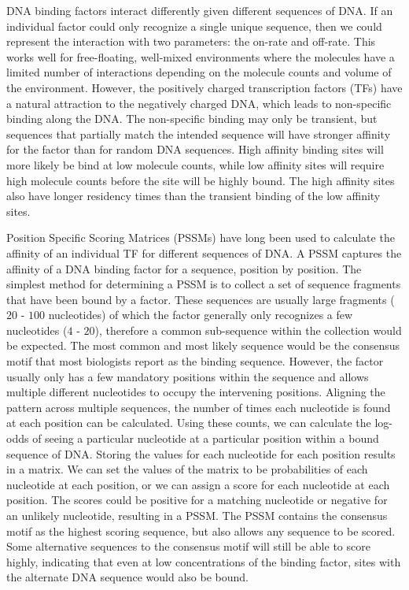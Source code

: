 \documentclass{article}
\newcommand{\tab}{\hspace{9mm}}
\begin{document}
\tab DNA binding factors interact differently given different sequences of DNA. If an individual factor could only recognize a single unique sequence, then we could represent the interaction with two parameters: the on-rate and off-rate. This works well for free-floating, well-mixed environments where the molecules have a limited number of interactions depending on the molecule counts and volume of the environment. However, the positively charged transcription factors (TFs) have a natural attraction to the negatively charged DNA, which leads to non-specific binding along the DNA. The non-specific binding may only be transient, but sequences that partially match the intended sequence will have stronger affinity for the factor than for random DNA sequences. High affinity binding sites will more likely be bind at low molecule counts, while low affinity sites will require high molecule counts before the site will be highly bound. The high affinity sites also have longer residency times than the transient binding of the low affinity sites.

\tab Position Specific Scoring Matrices (PSSMs) have long been used to calculate the affinity of an individual TF for different sequences of DNA. A PSSM captures the affinity of a DNA binding factor for a sequence, position by position. The simplest method for determining a PSSM is to collect a set of sequence fragments that have been bound by a factor. These sequences are usually large fragments ($20$ - $100$ nucleotides) of which the factor generally only recognizes a few nucleotides ($4$ - $20$), therefore a common sub-sequence within the collection would be expected. The most common and most likely sequence would be the consensus motif that most biologists report as the binding sequence. However, the factor usually only has a few mandatory positions within the sequence and allows multiple different nucleotides to occupy the intervening positions. Aligning the pattern across multiple sequences, the number of times each nucleotide is found at each position can be calculated. Using these counts, we can calculate the log-odds of seeing a particular nucleotide at a particular position within a bound sequence of DNA. Storing the values for each nucleotide for each position results in a matrix. We can set the values of the matrix to be probabilities of each nucleotide at each position, or we can assign a score for each nucleotide at each position. The scores could be positive for a matching nucleotide or negative for an unlikely nucleotide, resulting in a PSSM. The PSSM contains the consensus motif as the highest scoring sequence, but also allows any sequence to be scored. Some alternative sequences to the consensus motif will still be able to score highly, indicating that even at low concentrations of the binding factor, sites with the alternate DNA sequence would also be bound.
\end{document}
